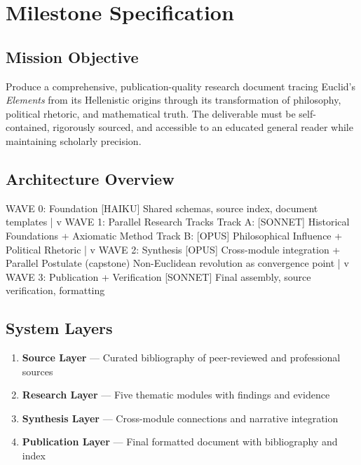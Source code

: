 \documentclass[11pt,letterpaper]{article}
\begin{document}
\section{Milestone Specification}

\subsection{Mission Objective}

Produce a comprehensive, publication-quality research document tracing Euclid's \textit{Elements} from its Hellenistic origins through its transformation of philosophy, political rhetoric, and mathematical truth. The deliverable must be self-contained, rigorously sourced, and accessible to an educated general reader while maintaining scholarly precision.

\subsection{Architecture Overview}

\begin{asciibox}
WAVE 0: Foundation
  [HAIKU] Shared schemas, source index, document templates
          |
          v
WAVE 1: Parallel Research Tracks
  Track A: [SONNET] Historical Foundations + Axiomatic Method
  Track B: [OPUS]   Philosophical Influence + Political Rhetoric
          |
          v
WAVE 2: Synthesis
  [OPUS] Cross-module integration + Parallel Postulate (capstone)
         Non-Euclidean revolution as convergence point
          |
          v
WAVE 3: Publication + Verification
  [SONNET] Final assembly, source verification, formatting
\end{asciibox}

\subsection{System Layers}

\begin{enumerate}
  \item \textbf{Source Layer} --- Curated bibliography of peer-reviewed and professional sources
  \item \textbf{Research Layer} --- Five thematic modules with findings and evidence
  \item \textbf{Synthesis Layer} --- Cross-module connections and narrative integration
  \item \textbf{Publication Layer} --- Final formatted document with bibliography and index
\end{enumerate}
\end{document}
